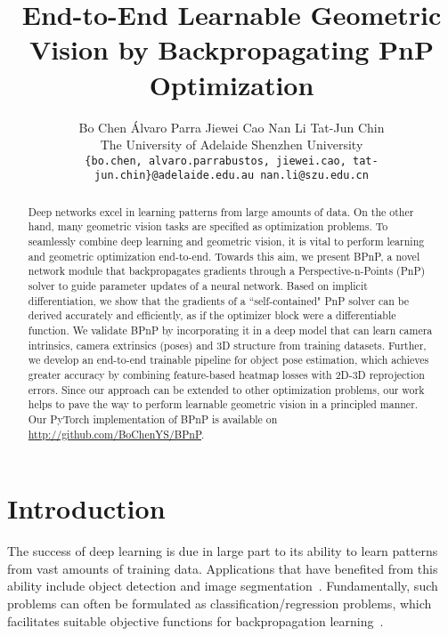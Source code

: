 \documentclass[10pt,twocolumn,letterpaper]{article}
\begin{document}
\title{End-to-End Learnable Geometric Vision by Backpropagating PnP Optimization}

\author{Bo Chen \quad \'{A}lvaro Parra \quad  Jiewei Cao \quad Nan Li \quad Tat-Jun Chin\\
The University of Adelaide \quad Shenzhen University\\
{\tt\small \{bo.chen, alvaro.parrabustos,  jiewei.cao, tat-jun.chin\}@adelaide.edu.au \quad nan.li@szu.edu.cn}
}

\maketitle


\begin{abstract}
Deep networks excel in learning patterns from large amounts of data. On the other hand, many geometric vision tasks are specified as optimization problems. To seamlessly combine deep learning and geometric vision, it is vital to perform learning and geometric optimization end-to-end. Towards this aim, we present BPnP, a novel network module that backpropagates gradients through a Perspective-n-Points (PnP) solver to guide parameter updates of a neural network. Based on implicit differentiation, we show that the gradients of a ``self-contained" PnP solver can be derived accurately and efficiently, as if the optimizer block were a differentiable function. We validate BPnP by incorporating it in a deep model that can learn camera intrinsics, camera extrinsics (poses) and 3D structure from training datasets. Further, we develop an end-to-end trainable pipeline for object pose estimation, which achieves greater accuracy by combining feature-based heatmap losses with 2D-3D reprojection errors. Since our approach can be extended to other optimization problems, our work helps to pave the way to perform learnable geometric vision in a principled manner. Our PyTorch implementation of BPnP is available on \url{http://github.com/BoChenYS/BPnP}.
\end{abstract}

\section{Introduction}

The success of deep learning is due in large part to its ability to learn patterns from vast amounts of training data. Applications that have benefited from this ability include object detection and image segmentation~\cite{krizhevsky12,he17}. Fundamentally, such problems can often be formulated as classification/regression problems, which facilitates suitable objective functions for backpropagation learning~\cite{lecun15}.
\end{document}
